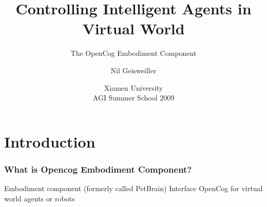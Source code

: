 \documentclass{beamer}
\title{Controlling Intelligent Agents in Virtual World}
\subtitle{The OpenCog Embodiment Component}
\author{Nil Geisweiller}
\institute[Xiamen University] %
{
  Novamente LLC
}
\date[Xiamen University AGI Summer School 2009] %
{Xiamen University\\ AGI Summer School 2009}
\begin{document}
\frame
{
  \maketitle
}
\section[Outline]{}
\frame{\tableofcontents}

\section{Introduction}

\frame
{

  \frametitle{What is Opencog Embodiment Component?}
  
  \begin{beamerboxesrounded}{Embodiment component (formerly called PetBrain)}
    Interface OpenCog for virtual world agents or robots
  \end{beamerboxesrounded}
  
}
\end{document}
